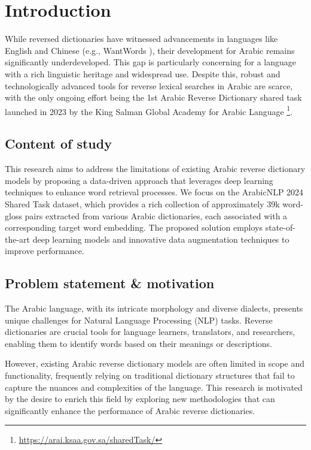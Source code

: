 \documentclass[12.5pt]{article}
\begin{document}
\newpage

\section{Introduction}

While reversed dictionaries have witnessed advancements in languages like English and Chinese (e.g., WantWords \cite{Qi2020}), their development for Arabic remains significantly underdeveloped. This gap is particularly concerning for a language with a rich linguistic heritage and widespread use. Despite this, robust and technologically advanced tools for reverse lexical searches in Arabic are scarce, with the only ongoing effort being the 1st Arabic Reverse Dictionary shared task launched in 2023 by the King Salman Global Academy for Arabic Language \footnote{\url{https://arai.ksaa.gov.sa/sharedTask/}}.


\subsection{Content of study}

This research aims to address the limitations of existing Arabic reverse dictionary models by proposing a data-driven approach that leverages deep learning techniques to enhance word retrieval processes. We focus on the ArabicNLP 2024 Shared Task dataset, which provides a rich collection of approximately 39k word-gloss pairs extracted from various Arabic dictionaries, each associated with a corresponding target word embedding. The proposed solution employs state-of-the-art deep learning models and innovative data augmentation techniques to improve performance.

\subsection{Problem statement \& motivation}

The Arabic language, with its intricate morphology and diverse dialects, presents unique challenges for Natural Language Processing (NLP) tasks. Reverse dictionaries are crucial tools for language learners, translators, and researchers, enabling them to identify words based on their meanings or descriptions.

However, existing Arabic reverse dictionary models are often limited in scope and functionality, frequently relying on traditional dictionary structures that fail to capture the nuances and complexities of the language. This research is motivated by the desire to enrich this field by exploring new methodologies that can significantly enhance the performance of Arabic reverse dictionaries.
\end{document}
